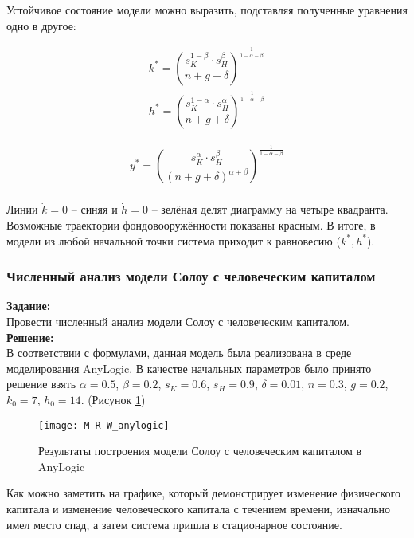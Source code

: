 Устойчивое состояние модели можно выразить, подставляя полученные уравнения одно в другое:
\begin{ceqn}
	\begin{align*}
		k^* = \left(\dfrac{s_K^{1-\beta} \cdot s_H^\beta}{n + g + \delta}\right)^{\frac{1}{1-\alpha-\beta}}\\
		h^* = \left(\dfrac{s_K^{1-\alpha} \cdot s_H^\alpha}{n + g + \delta}\right)^{\frac{1}{1-\alpha-\beta}}
	\end{align*}
\end{ceqn}

\begin{ceqn}
	\begin{align*}
		y^* = \left(\dfrac{s_K^{\alpha} \cdot s_H^\beta}{(n + g + \delta)^{\alpha+\beta}}\right)^{\frac{1}{1-\alpha-\beta}}\\
	\end{align*}
\end{ceqn}

Линии $\dot{k} = 0$ -- синяя и $\dot{h} = 0$ -- зелёная делят диаграмму на четыре квадранта. Возможные траектории фондовооружённости показаны красным. В итоге, в модели из любой начальной точки система приходит к равновесию ($k^*, h^*$).

\subsubsection*{Численный анализ модели Солоу с человеческим капиталом}

\textbf{Задание:}\\
Провести численный анализ модели Солоу с человеческим капиталом.\\

\textbf{Решение:}\\
В соответствии с формулами, данная модель была реализована в среде моделирования AnyLogic. В качестве начальных параметров было принято решение взять $\alpha = 0.5$, $\beta = 0.2$, $s_K = 0.6$, $s_H = 0.9$, $\delta = 0.01$, $n = 0.3$, $g = 0.2$, $k_0 = 7$, $h_0 = 14$. (Рисунок \ref{fig:M-R-W_anylogic})
\begin{figure}[h]
	\centering \texttt{[image: M-R-W\_anylogic]}
	\caption{Результаты построения модели Солоу с человеческим капиталом в AnyLogic}
	\label{fig:M-R-W_anylogic}
\end{figure}

\newpage

Как можно заметить на графике, который демонстрирует изменение физического капитала и изменение человеческого капитала с течением времени, изначально имел место спад, а затем система пришла в стационарное состояние.\\

